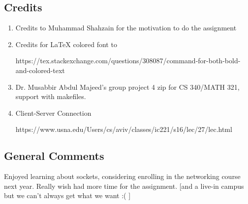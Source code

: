 \documentclass[a4paper]{article}
\begin{document}
    \subsection{Credits}
        \begin{enumerate}
            \item Credits to Muhammad Shahzain for the motivation to do the assignment
            
            \item Credits for \LaTeX{} colored font to 
            \begin{spverbatim}
https://tex.stackexchange.com/questions/308087/command-for-both-bold-and-colored-text
            \end{spverbatim}
            
            \item Dr. Musabbir Abdul Majeed's group project 4 zip for CS 340/MATH 321, support with makefiles.
            \item Client-Server Connection
            \begin{spverbatim}
https://www.usna.edu/Users/cs/aviv/classes/ic221/s16/lec/27/lec.html
            \end{spverbatim} 
        \end{enumerate}
    \subsection{General Comments}
        Enjoyed learning about sockets, considering enrolling in the networking course next year. Really wish had more time for the assignment. [and a live-in campus but we can't always get what we want :( ] 
\end{document}
